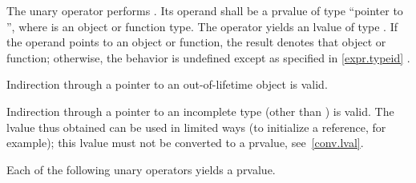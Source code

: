 \pnum
{}%
%
The unary \tcode{*} operator performs .
%
Its operand shall be a prvalue of type ``pointer to '',
where  is an object or function type.
The operator yields an lvalue of type .
If the operand points to an object or function,
the result denotes that object or function;
otherwise, the behavior is undefined except as specified in \ref{expr.typeid}
.
%
%
%
%
%
\begin{note}
Indirection through a pointer to an out-of-lifetime object is valid.
\end{note}
\begin{note}
%
Indirection through a pointer to an incomplete type (other than
\cv{} ) is valid. The lvalue thus obtained can be
used in limited ways (to initialize a reference, for example); this
lvalue must not be converted to a prvalue, see~\ref{conv.lval}.
\end{note}

\pnum
Each of the following unary operators yields a prvalue.

